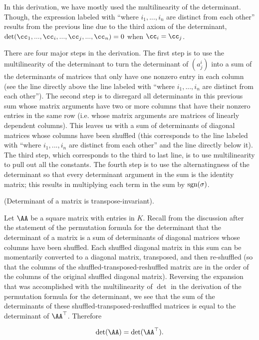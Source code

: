 \begin{deriv}
    In this derivation, we have mostly used the multilinearity of the determinant. Though, the expression labeled with ``where $i_1, ..., i_n$ are distinct from each other'' results from the previous line due to the third axiom of the determinant, $\det(\cc_1, ..., \cc_i, ..., \cc_j, ..., \cc_n) = 0$ when $\cc_i = \cc_j$.
    
    There are four major steps in the derivation. The first step is to use the multilinearity of the determinant to turn the determinant of $(a^i_j)$ into a sum of the determinants of matrices that only have one nonzero entry in each column (see the line directly above the line labeled with ``where $i_1, ..., i_n$ are distinct from each other''). The second step is to disregard all determinants in this previous sum whose matrix arguments have two or more columns that have their nonzero entries in the same row (i.e. whose matrix arguments are matrices of linearly dependent columns). This leaves us with a sum of determinants of diagonal matrices whose columns have been shuffled (this corresponds to the line labeled with ``where $i_1, ..., i_n$ are distinct from each other'' and the line directly below it). The third step, which corresponds to the third to last line, is to use multilinearity to pull out all the constants. The fourth step is to use the alternatingness of the determinant so that every determinant argument in the sum is the identity matrix; this results in multiplying each term in the sum by $\text{sgn}(\sigma)$.
\end{deriv}

\begin{theorem}
\label{ch::exterior_pwrs::thm::det_transpose_invariant}
    
    (Determinant of a matrix is transpose-invariant).
    
    Let $\AA$ be a square matrix with entries in $K$. Recall from the discussion after the statement of the permutation formula for the determinant that the determinant of a matrix is a sum of determinants of diagonal matrices whose columns have been shuffled. Each shuffled diagonal matrix in this sum can be momentarily converted to a diagonal matrix, transposed, and then re-shuffled (so that the columns of the shuffled-transposed-reshuffled matrix are in the order of the columns of the original shuffled diagonal matrix). Reversing the expansion that was accomplished with the multilinearity of $\det$ in the derivation of the permutation formula for the determinant, we see that the sum of the determinants of these shuffled-transposed-reshuffled matrices is equal to the determinant of $\AA^\top$. Therefore
    
    \begin{align*}
        \det(\AA) = \det(\AA^\top).
    \end{align*}
\end{theorem}

